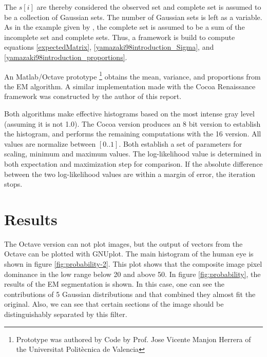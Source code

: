 \documentclass[]{article}
\begin{document}
The $s[i]$ are thereby considered the observed set and complete set is assumed to be a collection of Gaussian sets.   The number of Gaussian sets is left as a variable.   As in the example given by \cite{yamazaki98introduction}, the complete set is assumed to be a sum of the incomplete set and complete sets.  Thus, a framework is build to compute equations \ref{expectedMatrix}, \ref{yamazaki98introduction_Sigma}, and \ref{yamazaki98introduction_proportions}.  

An Matlab/Octave prototype \footnote{Prototype was authored by Code by Prof. Jose Vicente Manjon Herrera of the Universitat Politècnica de Val{e}ncia} obtains the mean, variance, and proportions from the EM algorithm.   A similar implementation made with the Cocoa Renaissance framework was constructed by the author of this report. %

Both algorithms make effective histograms based on the most intense gray level (assuming it is not 1.0).  The Cocoa version produces an 8 bit version to establish the histogram, and performs the remaining computations with the 16 version.   All values are normalize between $[0..1]$.  Both establish a set of parameters for scaling, minimum and maximum values.   The log-likelihood value is determined in both expectation and maximization step for comparison.   If the absolute difference between the two log-likelihood values are within a margin of error, the iteration stops.

\section{Results} %
\label{sec:results}


The Octave version can not plot images, but the output of vectors from the Octave can be plotted with GNUplot.   The main histogram of the human eye is shown in figure \ref{fig:probability-2}.  This plot shows that the composite image pixel dominance in the low range below 20 and above 50.  In figure \ref{fig:probability}, the results of the EM segmentation is shown.   In this case, one can see the contributions of 5 Gaussian distributions and that combined they almost fit the original.  Also, we can see that certain sections of the image should be distinguishably separated by this filter.
\end{document}
